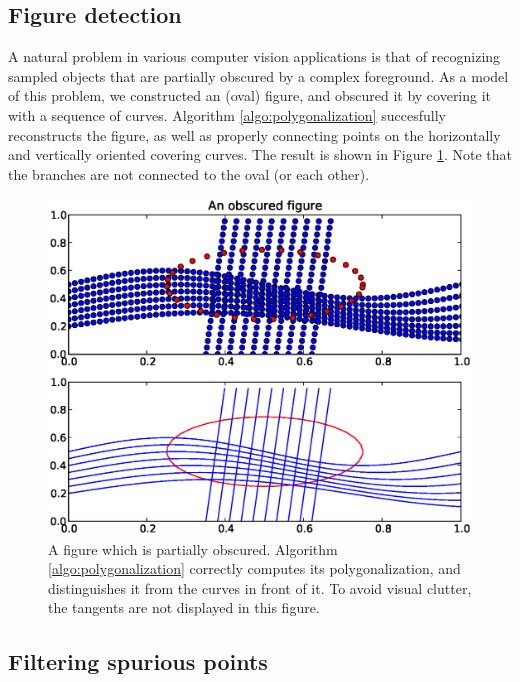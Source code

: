 \documentclass{article}
\numberwithin{cntr}{section}
\numberwithin{equation}{section}
\begin{document}
\subsection{Figure detection}

A natural problem in various computer vision applications is that of
recognizing sampled objects that are partially obscured by a
complex foreground.
As a model of this problem, we constructed an (oval)
figure, and obscured it by covering it with a sequence of curves.
Algorithm \ref{algo:polygonalization} succesfully reconstructs the
figure, as well as properly connecting points on the
horizontally and vertically oriented covering curves.
The result is shown in
Figure \ref{fig:obscuredExample}. Note that the branches are not
connected to the oval (or each other).

\begin{figure}
\setlength{\unitlength}{0.240900pt}
\ifx\plotpoint\undefined\newsavebox{\plotpoint}\fi
\sbox{\plotpoint}{\rule[-0.200pt]{0.400pt}{0.400pt}}%
\includegraphics[scale=0.5]{obscured_figure.eps}
\caption{A figure which is partially obscured.
Algorithm \ref{algo:polygonalization} correctly computes its
polygonalization, and distinguishes it from the curves in front of it.
To avoid visual clutter, the tangents are not displayed in this figure.}
\label{fig:obscuredExample}
\end{figure}

\subsection{Filtering spurious points}
\end{document}
